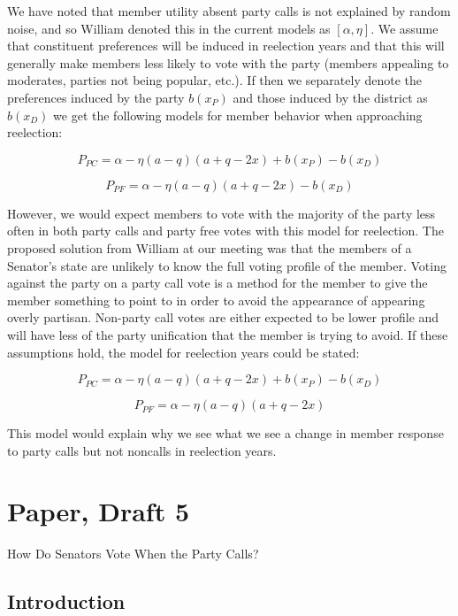 \documentclass[12pt]{article}
\begin{document}
We have noted that member utility absent party calls is not explained by random noise, and so William denoted this in the current models as $ [\alpha, \eta] $. We assume that constituent preferences will be induced in reelection years and that this will generally make members less likely to vote with the party (members appealing to moderates, parties not being popular, etc.). If then we separately denote the preferences induced by the party $ b(x_P) $ and those induced by the district as $ b(x_D) $ we get the following models for member behavior when approaching reelection:

$$ P_{PC} = \alpha - \eta (a - q) (a + q - 2x) + b(x_P) - b(x_D) $$

$$ P_{PF} = \alpha - \eta (a - q) (a + q - 2x) - b(x_D) $$

However, we would expect members to vote with the majority of the party less often in both party calls and party free votes with this model for reelection. The proposed solution from William at our meeting was that the members of a Senator's state are unlikely to know the full voting profile of the member. Voting against the party on a party call vote is a method for the member to give the member something to point to in order to avoid the appearance of appearing overly partisan. Non-party call votes are either expected to be lower profile and will have less of the party unification that the member is trying to avoid. If these assumptions hold, the model for reelection years could be stated:

$$ P_{PC} = \alpha - \eta (a - q) (a + q - 2x) + b(x_P) - b(x_D) $$

$$ P_{PF} = \alpha - \eta (a - q) (a + q - 2x) $$

This model would explain why we see what we see a change in member response to party calls but not noncalls in reelection years.

\pagebreak

\doublespacing
	
\section{Paper, Draft 5}

\begin{center}
	\large How Do Senators Vote When the Party Calls?
\end{center}

\subsection{Introduction}
\end{document}
